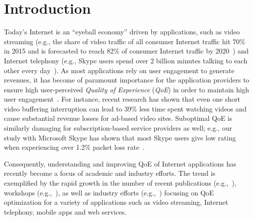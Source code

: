 \chapter{Introduction}


Today's Internet is an ``eyeball economy'' driven by applications, such 
as video streaming (e.g., the share of video traffic of all consumer Internet 
traffic  hit 70\% in 2015 and is forecasted to reach 82\% of consumer Internet traffic by 
2020~\cite{cisco-forecast-2015}) and Internet telephony (e.g., Skype users spend over 
2 billion minutes talking to each other every day~\cite{skype-2-billion-minutes}). 
As most applications rely on user engagement to generate revenues, 
it has become of paramount importance for the
application providers to ensure high user-perceived 
{\em Quality of Experience} ({\em QoE}) in order to maintain high user 
engagement~\cite{sigcomm13athula}.
For instance, recent research has shown that even one short video buffering 
interruption can lead to 39\% less time spent watching videos and 
cause substantial  revenue losses for ad-based video sites. 
Suboptimal QoE is similarly damaging for subscription-based 
service providers as well; e.g., our study with Microsoft Skype 
has shown that most Skype  users give low rating when experiencing over
1.2\% packet loss rate~\cite{via}.

Consequently, understanding and improving QoE of Internet applications 
has recently become a focus of academic and industry efforts. 
The trend is exemplified by the rapid growth in the number of recent
publications (e.g.,~\cite{sigcomm13athula,sigcomm12,
wang2014speedy,sigcomm11,eona,krishnan2013video}), workshops 
(e.g.,~\cite{workshop-wmust,workshop-fhmn,workshop-qoe}), 
as well as industry efforts (e.g.,~\cite{conviva,artizanetworks}) focusing on QoE optimization 
for a variety of applications such as video streaming, Internet telephony, mobile 
apps and web services.



